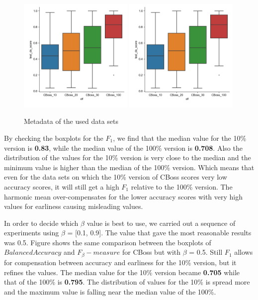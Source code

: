 \begin{figure}[!htbp]
  \captionsetup{justification=raggedright}
  \includegraphics[width=0.49\textwidth,keepaspectratio]{boxplot_accuracy_CBoss.jpg}
  \includegraphics[width=0.49\textwidth,keepaspectratio]{boxplot_accuracy_CBoss.jpg}
  \caption{Metadata of the used data sets}
  \label{fig:FBeta1}
\end{figure}

By checking the boxplots for the $F_{1}$, we find that the median value for the 10\% version is \textbf{0.83}, while the median value of the 100\% version is \textbf{0.708}.
Also the distribution of the values for the 10\% version is very close to the median and the minimum value is higher than the median of the 100\% version.
Which means that even for the data sets on which the 10\% version of CBoss scores very low accuracy scores, it will still get a high $F_{1}$ relative to the 100\% version.
The harmonic mean over-compensates for the lower accuracy scores with very high values for earliness causing misleading values.

In order to decide which $\beta$ value is best to use, we carried out a sequence of experiments using $\beta$ = [0.1, 0.9].
The value that gave the most reasonable results was 0.5.
Figure shows the same comparison between the boxplots of $Balanced Accuracy$ and $F_{\beta}-measure$ for CBoss but with $\beta$ = 0.5.
Still $F_{1}$ allows for compensation between accuracy and earliness for the 10\% version, but it refines the values.
The median value for the 10\% version became \textbf{0.705} while that of the 100\% is \textbf{0.795}.
The distribution of values for the 10\% is spread more and the maximum value is falling near the median value of the 100\%.

